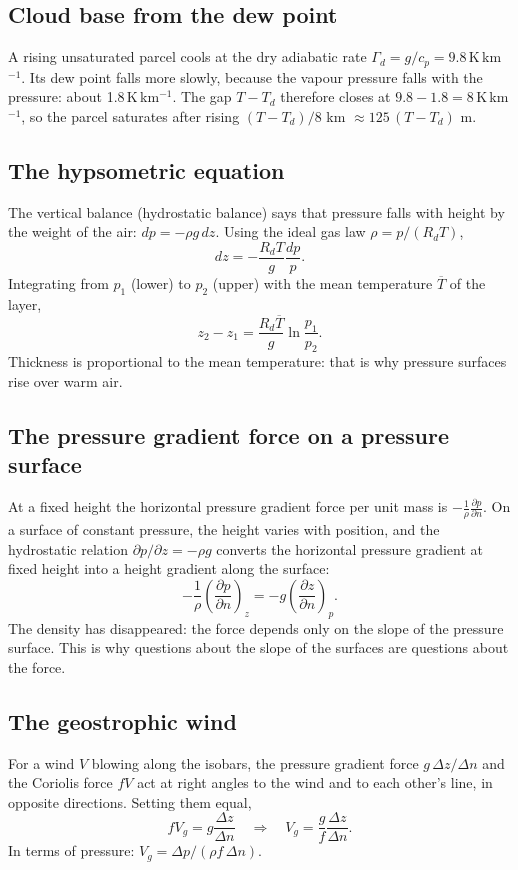\subsection{Cloud base from the dew point}

A rising unsaturated parcel cools at the dry adiabatic rate $\Gamma_d=g/c_p=9.8$\,K\,km$^{-1}$. Its dew point falls more slowly, because the vapour pressure falls with the pressure: about 1.8\,K\,km$^{-1}$. The gap $T-T_d$ therefore closes at $9.8-1.8=8$\,K\,km$^{-1}$, so the parcel saturates after rising $(T-T_d)/8$ km $\approx125\,(T-T_d)$ m.

\subsection{The hypsometric equation}

The vertical balance (hydrostatic balance) says that pressure falls with height by the weight of the air: $dp=-\rho g\,dz$. Using the ideal gas law $\rho=p/(R_dT)$,
\[
dz=-\frac{R_dT}{g}\frac{dp}{p}.
\]
Integrating from $p_1$ (lower) to $p_2$ (upper) with the mean temperature $\overline{T}$ of the layer,
\[
z_2-z_1=\frac{R_d\overline{T}}{g}\ln\frac{p_1}{p_2}.
\]
Thickness is proportional to the mean temperature: that is why pressure surfaces rise over warm air.

\subsection{The pressure gradient force on a pressure surface}

At a fixed height the horizontal pressure gradient force per unit mass is $-\frac{1}{\rho}\frac{\partial p}{\partial n}$. On a surface of constant pressure, the height varies with position, and the hydrostatic relation $\partial p/\partial z=-\rho g$ converts the horizontal pressure gradient at fixed height into a height gradient along the surface:
\[
-\frac{1}{\rho}\left(\frac{\partial p}{\partial n}\right)_z=-g\left(\frac{\partial z}{\partial n}\right)_p .
\]
The density has disappeared: the force depends only on the slope of the pressure surface. This is why questions about the slope of the surfaces are questions about the force.

\subsection{The geostrophic wind}

For a wind $V$ blowing along the isobars, the pressure gradient force $g\,\Delta z/\Delta n$ and the Coriolis force $fV$ act at right angles to the wind and to each other's line, in opposite directions. Setting them equal,
\[
fV_g=g\frac{\Delta z}{\Delta n}\quad\Longrightarrow\quad V_g=\frac{g}{f}\frac{\Delta z}{\Delta n}.
\]
In terms of pressure: $V_g=\Delta p/(\rho f\,\Delta n)$.

